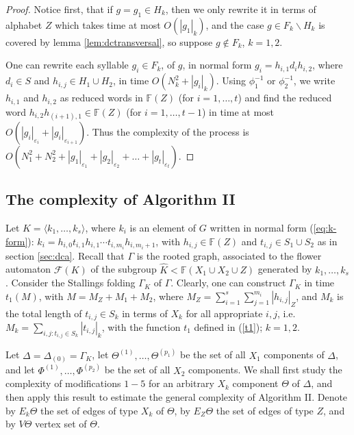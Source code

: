 \documentclass[a4paper,12pt]{article}
\newcommand{\G}{\Gamma }
\newcommand{\D}{\Delta }
\newcommand{\e}{\varepsilon }
\newcommand{\T}{\Theta }
\newcommand{\cF}{{\cal{F}}}
\numberwithin{equation}{section}
\numberwithin{figure}{section}
\newcommand{\FF}{\ensuremath{\mathbb{F}}}
\renewcommand{\cF}{\mathcal{F}}
\newcommand{\la}{\langle}
\newcommand{\ra}{\rangle}
\begin{document}
\begin{proof} Notice first, that if $g = g_1 \in H_k$, then we
only rewrite it in terms of alphabet $Z$ which takes time at most
$O(|g_1|_k)$, and the case $g \in F_k \smallsetminus H_k$ is
covered by lemma \ref{lem:dctransversal}, so suppose $g \notin
F_k$, $k=1,2$.

One can rewrite each syllable $g_i \in F_k$, of $g$, in normal form
$g_i=h_{i,1}d_ih_{i,2}$, where $d_i\in S$ and $h_{i,j}\in H_1\cup
H_2$, in time  $O(N^2_k + |g_i|_k)$. Using $\phi_1^{-1}$ or
$\phi_2^{-1}$, we write $h_{i,1}$ and $h_{i,2}$ as reduced words
in $\FF(Z)$ (for $i=1, \ldots, t$) and find the reduced word
$h_{i,2}h_{(i+1),1}\in \FF(Z)$ (for $i=1, \ldots, t-1$) in time at
most $O(|g_i|_{\e_i}+|g_i|_{\e_{i+1}})$.  Thus the 
complexity of the process is $O(N^2_1+ N^2_2 +
|g_1|_{\e_1}+|g_2|_{\e_2}+ \ldots +|g_t|_{\e_t})$. \end{proof}


\subsection{The complexity of Algorithm II}\label{sub:resolution}

Let $K=\la k_1, \ldots , k_s\ra$, where $k_i$ is an element of $G$
written in normal form (\ref{eq:k-form}): $k_i=
h_{i,0}t_{i,1}h_{i,1}\cdots t_{i,m_i}h_{i,m_i+1}$, with
$h_{i,j}\in \FF(Z)$ and $t_{i,j}\in S_1\cup S_2$ as in section
\ref{sec:dca}. Recall that $\G$ is the rooted graph, associated to
the flower automaton $\cF(K)$ of the subgroup $\hat K < \FF(X_1\cup
X_2 \cup Z)$ generated by $k_1, \ldots , k_s$.
Consider the Stallings folding $\G_K$ of $\G$. Clearly, one can
construct $\G_K$ in time  $t_1(M)$, with $M = M_Z+M_1+M_2$,
 where $M_Z =
\mathop{\sum}\limits_{i=1}^{s}
\mathop{\sum}\limits_{j=1}^{m_i}|h_{i,j}|_Z$, and $M_k$ is the
total length of $t_{i,j} \in S_k$ in terms of $X_k$ for all
appropriate $i,j$, i.e. $M_k = \mathop{\sum}\limits_{i,j:
t_{i,j}\in S_k} |t_{i,j}|_k$, with the function $t_1$ defined in 
(\ref{t1}); $k=1,2$.

Let $\D=\D_{(0)} = \G_K$, let $\T^{(1)}, \ldots, \T^{(p_1)}$ be
the set of all $X_1$ components of $\D$, and let $\Phi^{(1)}, \ldots,
\Phi^{(p_2)}$ be the set of all $X_2$ components. 
We shall first study  the complexity of modifications $1-5$ for an
arbitrary $X_k$ component $\T$ of $\D$, and then apply this result
to estimate the general complexity of Algorithm II. Denote by
$E_k \T$ the set of edges of type $X_k$ of $\T$, by $E_Z \T$
the set of edges of type $Z$,  and by $V \T$  
vertex set of $\T$.
\end{document}
